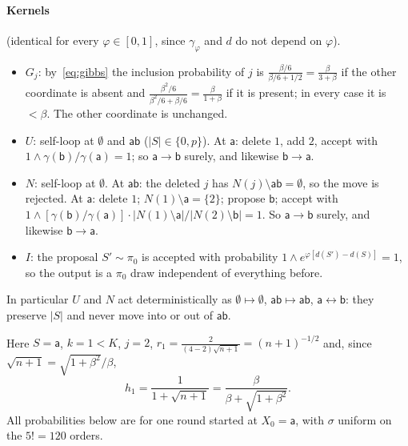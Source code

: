 \documentclass[11pt]{article}
\theoremstyle{definition}
\newcommand{\ph}{\varphi}
\newcommand{\sa}{\mathsf a}
\newcommand{\sbb}{\mathsf b}
\newcommand{\sab}{\mathsf{ab}}
\begin{document}
\paragraph{Kernels} (identical for every $\ph\in[0,1]$, since $\gamma_\ph$ and $d$ do not depend on $\ph$).
\begin{itemize}
\item $G_j$: by~\eqref{eq:gibbs} the inclusion probability of $j$ is $\frac{\beta/6}{\beta/6+1/2}=\frac{\beta}{3+\beta}$ if the other coordinate is absent and $\frac{\beta^2/6}{\beta^2/6+\beta/6}=\frac{\beta}{1+\beta}$ if it is present; in every case it is $<\beta$. The other coordinate is unchanged.
\item $U$: self-loop at $\emptyset$ and $\sab$ ($|S|\in\{0,p\}$). At $\sa$: delete $1$, add $2$, accept with $1\wedge\gamma(\sbb)/\gamma(\sa)=1$; so $\sa\to\sbb$ surely, and likewise $\sbb\to\sa$.
\item $N$: self-loop at $\emptyset$. At $\sab$: the deleted $j$ has $N(j)\setminus\sab=\emptyset$, so the move is rejected. At $\sa$: delete $1$; $N(1)\setminus\sa=\{2\}$; propose $\sbb$; accept with $1\wedge[\gamma(\sbb)/\gamma(\sa)]\cdot|N(1)\setminus\sa|/|N(2)\setminus\sbb|=1$. So $\sa\to\sbb$ surely, and likewise $\sbb\to\sa$.
\item $I$: the proposal $S'\sim\pi_0$ is accepted with probability $1\wedge e^{\ph[d(S')-d(S)]}=1$, so the output is a $\pi_0$ draw independent of everything before.
\end{itemize}
In particular $U$ and $N$ act deterministically as $\emptyset\mapsto\emptyset$, $\sab\mapsto\sab$, $\sa\leftrightarrow\sbb$: they preserve $|S|$ and never move into or out of $\sab$.

Here $S=\sa$, $k=1<K$, $j=2$, $r_1=\frac{2}{(4-2)\sqrt{n+1}}=(n+1)^{-1/2}$ and, since $\sqrt{n+1}=\sqrt{1+\beta^2}/\beta$,
\begin{equation}\label{eq:h1}
h_1=\frac1{1+\sqrt{n+1}}=\frac{\beta}{\beta+\sqrt{1+\beta^2}}.
\end{equation}
All probabilities below are for one round started at $X_0=\sa$, with $\sigma$ uniform on the $5!=120$ orders.
\end{document}
